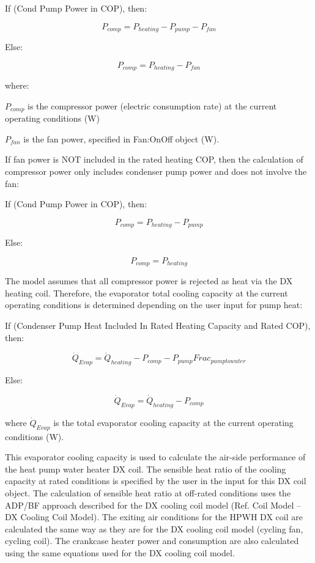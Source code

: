 If (Cond Pump Power in COP), then:

\begin{equation}
  P_{comp} = P_{heating}-P_{pump}-P_{fan}
\end{equation}

Else:

\begin{equation}
  P_{comp} = P_{heating}-P_{fan}
\end{equation}

where:

\({P_{comp}}\) is the compressor power (electric consumption rate) at the current operating conditions (W)

\({P_{fan}}\) is the fan power, specified in Fan:OnOff object (W).

If fan power is NOT included in the rated heating COP, then the calculation of compressor power only includes condenser pump power and does not involve the fan:

If (Cond Pump Power in COP), then:

\begin{equation}
  P_{comp} = P_{heating}-P_{pump}
\end{equation}

Else:

\begin{equation}
  P_{comp} = P_{heating}
\end{equation}

The model assumes that all compressor power is rejected as heat via the DX heating coil. Therefore, the evaporator total cooling capacity at the current operating conditions is determined depending on the user input for pump heat:

If (Condenser Pump Heat Included In Rated Heating Capacity and Rated COP), then:

\begin{equation}
  \dot{Q}_{Evap} = \dot{Q}_{heating} - P_{comp} - P_{pump}Frac_{pumptowater}
\end{equation}

Else:

\begin{equation}
  \dot{Q}_{Evap} = \dot{Q}_{heating} - P_{comp}
\end{equation}

where \({\dot{Q}_{Evap}}\) is the total evaporator cooling capacity at the current operating conditions (W).

This evaporator cooling capacity is used to calculate the air-side performance of the heat pump water heater DX coil. The sensible heat ratio of the cooling capacity at rated conditions is specified by the user in the input for this DX coil object. The calculation of sensible heat ratio at off-rated conditions uses the ADP/BF approach described for the DX cooling coil model (Ref. Coil Model -- DX Cooling Coil Model). The exiting air conditions for the HPWH DX coil are calculated the same way as they are for the DX cooling coil model (cycling fan, cycling coil). The crankcase heater power and consumption are also calculated using the same equations used for the DX cooling coil model.

